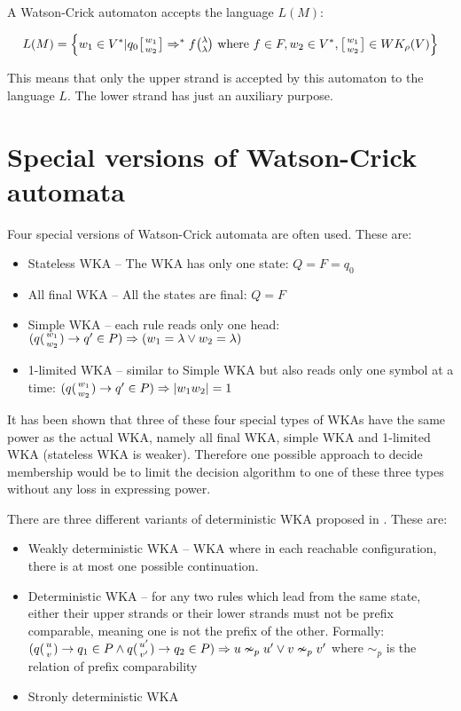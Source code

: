 A Watson-Crick automaton accepts the language $L(M)$:

$$L(M) = \Big\{w_1 \in V^* | q_0 \wkdomain{w_1}{w_2} \Rightarrow^* f \genfrac{(}{)}{0pt}{1}{\lambda}{\lambda} \textnormal{ where } f \in F, w_2 \in V^*, \wkdomain{w_1}{w_2} \in WK_{\rho}(V)\Big\}$$

This means that only the upper strand is accepted by this automaton to the language $L$. The lower strand has just an auxiliary purpose.

\section{Special versions of Watson-Crick automata}
Four special versions of Watson-Crick automata are often used. These are:
\begin{itemize}
  \item{Stateless WKA -- The WKA has only one state: $Q = F = {q_0}$}
  \item{All final WKA -- All the states are final: $Q = F$}
  \item{Simple WKA -- each rule reads only one head: $(q({w_1 \atop w_2}) \rightarrow q' \in P) \Rightarrow (w_1 = \lambda \vee w_2 = \lambda)$}
  \item{1-limited WKA -- similar to Simple WKA but also reads only one symbol at a time: $(q({w_1 \atop w_2}) \rightarrow q' \in P) \Rightarrow |w_1 w_2| = 1$}
\end{itemize}

It has been shown that three of these four special types of WKAs have the same power as the actual WKA, namely all final WKA, simple WKA and 1-limited WKA (stateless WKA is weaker). Therefore one possible approach to decide membership would be to limit the decision algorithm to one of these three types without any loss in expressing power.

There are three different variants of deterministic WKA proposed in \cite{DETERM_WKA}. These are:
\begin{itemize}
  \item{Weakly deterministic WKA -- WKA where in each reachable configuration, there is at most one possible continuation.}
  \item{Deterministic WKA -- for any two rules which lead from the same state, either their upper strands or their lower strands must not be prefix comparable, meaning one is not the prefix of the other. Formally: $(q({u \atop v}) \rightarrow q_1 \in P \wedge q({u' \atop v'}) \rightarrow q_2 \in P) \Rightarrow u \nsim_p u' \vee v \nsim_p v'$ where $\sim_p$ is the relation of prefix comparability}
  \item{Stronly deterministic WKA}
\end{itemize}

